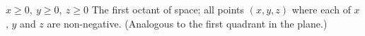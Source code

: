 {$x\geq 0,\ y\geq0, \ z\geq0$
}
{The first octant of space; all points $(x,y,z)$ where each of $x$, $y$ and $z$ are non-negative. (Analogous to the first quadrant in the plane.)
}
